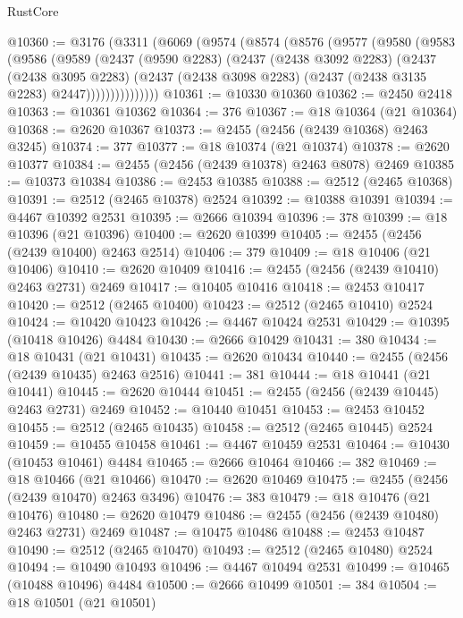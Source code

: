 \begin{lexlean}{RustCore}
\begin{coremodule}
@10360 := @3176
    (@3311
      (@6069
        (@9574
          (@8574
            (@8576
              (@9577
                (@9580
                  (@9583
                    (@9586
                      (@9589
                        (@2437
                          (@9590 @2283)
                          (@2437
                            (@2438 @3092 @2283)
                            (@2437
                              (@2438 @3095 @2283)
                              (@2437
                                (@2438 @3098 @2283)
                                (@2437 (@2438 @3135 @2283) @2447)))))))))))))))
@10361 := @10330 @10360
@10362 := @2450 @2418
@10363 := @10361 @10362
@10364 := 376
@10367 := @18 @10364 (@21 @10364)
@10368 := @2620 @10367
@10373 := @2455 (@2456 (@2439 @10368) @2463 @3245)
@10374 := 377
@10377 := @18 @10374 (@21 @10374)
@10378 := @2620 @10377
@10384 := @2455 (@2456 (@2439 @10378) @2463 @8078) @2469
@10385 := @10373 @10384
@10386 := @2453 @10385
@10388 := @2512 (@2465 @10368)
@10391 := @2512 (@2465 @10378) @2524
@10392 := @10388 @10391
@10394 := @4467 @10392 @2531
@10395 := @2666 @10394
@10396 := 378
@10399 := @18 @10396 (@21 @10396)
@10400 := @2620 @10399
@10405 := @2455 (@2456 (@2439 @10400) @2463 @2514)
@10406 := 379
@10409 := @18 @10406 (@21 @10406)
@10410 := @2620 @10409
@10416 := @2455 (@2456 (@2439 @10410) @2463 @2731) @2469
@10417 := @10405 @10416
@10418 := @2453 @10417
@10420 := @2512 (@2465 @10400)
@10423 := @2512 (@2465 @10410) @2524
@10424 := @10420 @10423
@10426 := @4467 @10424 @2531
@10429 := @10395 (@10418 @10426) @4484
@10430 := @2666 @10429
@10431 := 380
@10434 := @18 @10431 (@21 @10431)
@10435 := @2620 @10434
@10440 := @2455 (@2456 (@2439 @10435) @2463 @2516)
@10441 := 381
@10444 := @18 @10441 (@21 @10441)
@10445 := @2620 @10444
@10451 := @2455 (@2456 (@2439 @10445) @2463 @2731) @2469
@10452 := @10440 @10451
@10453 := @2453 @10452
@10455 := @2512 (@2465 @10435)
@10458 := @2512 (@2465 @10445) @2524
@10459 := @10455 @10458
@10461 := @4467 @10459 @2531
@10464 := @10430 (@10453 @10461) @4484
@10465 := @2666 @10464
@10466 := 382
@10469 := @18 @10466 (@21 @10466)
@10470 := @2620 @10469
@10475 := @2455 (@2456 (@2439 @10470) @2463 @3496)
@10476 := 383
@10479 := @18 @10476 (@21 @10476)
@10480 := @2620 @10479
@10486 := @2455 (@2456 (@2439 @10480) @2463 @2731) @2469
@10487 := @10475 @10486
@10488 := @2453 @10487
@10490 := @2512 (@2465 @10470)
@10493 := @2512 (@2465 @10480) @2524
@10494 := @10490 @10493
@10496 := @4467 @10494 @2531
@10499 := @10465 (@10488 @10496) @4484
@10500 := @2666 @10499
@10501 := 384
@10504 := @18 @10501 (@21 @10501)

\end{coremodule}
\end{lexlean}
